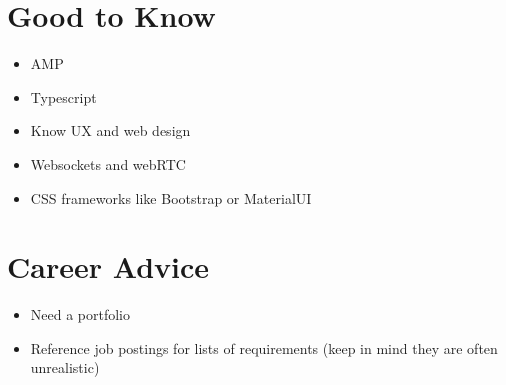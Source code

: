 \documentclass[12pt]{article}
\begin{document}
\section{Good to Know}

\begin{itemize}
\item AMP
\item Typescript
\item Know UX and web design
\item Websockets and webRTC
\item CSS frameworks like Bootstrap or MaterialUI
\end{itemize}

\section{Career Advice}

\begin{itemize}
\item Need a portfolio
\item Reference job postings for lists of requirements (keep in mind
  they are often unrealistic)
\end{itemize}
\end{document}
